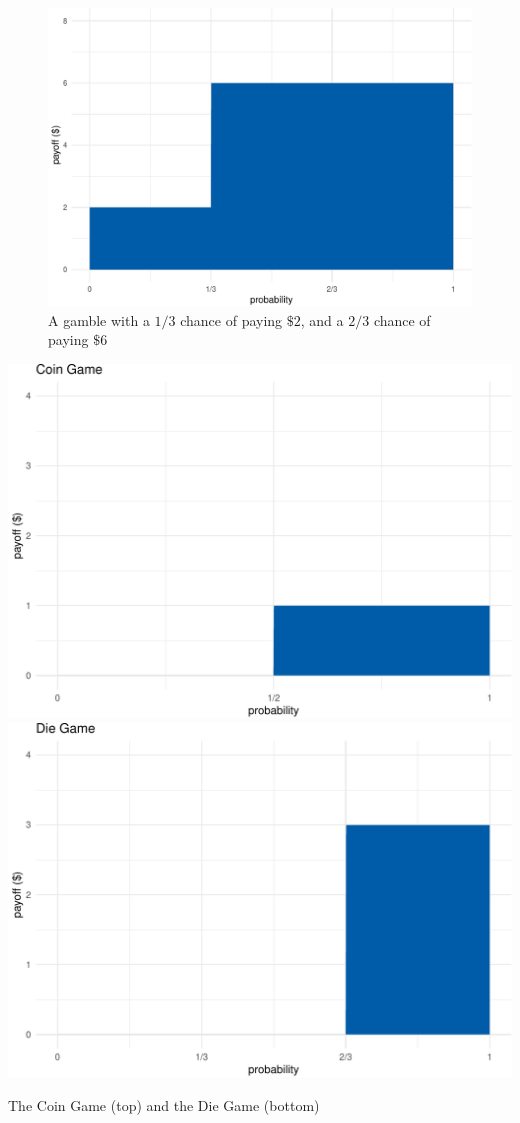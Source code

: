 \documentclass[justified]{tufte-book}
\theoremstyle{definition}
\theoremstyle{definition}
\theoremstyle{definition}
\theoremstyle{remark}
\begin{document}
\begin{figure}
\includegraphics{_main_files/figure-latex/gambleviz-1} \caption[A gamble with a $1/3$ chance of paying $\$2$, and a $2/3$ chance of paying $\$6$]{A gamble with a $1/3$ chance of paying $\$2$, and a $2/3$ chance of paying $\$6$}\label{fig:gambleviz}
\end{figure}
\begin{marginfigure}
\includegraphics{_main_files/figure-latex/coindiegame-1} \includegraphics{_main_files/figure-latex/coindiegame-2} \caption[The Coin Game (top) and the Die Game (bottom)]{The Coin Game (top) and the Die Game (bottom)}\label{fig:coindiegame}
\end{marginfigure}
\end{document}
